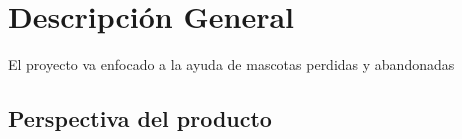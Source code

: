 \chapter{Descripción General}
El proyecto va enfocado a la ayuda de mascotas perdidas y abandonadas
\section{Perspectiva del producto}